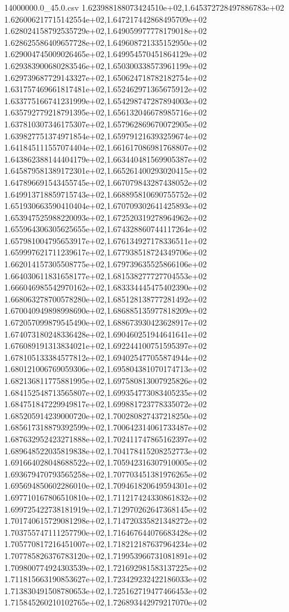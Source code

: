 \begin{filecontents*}{14000000.0_45.0.csv}
1.623988188073424510e+02,1.645372728497886783e+02
1.626006217715142554e+02,1.647217442868495709e+02
1.628024158792535729e+02,1.649059977778179018e+02
1.628625586409657728e+02,1.649608721335152950e+02
1.629004745009026465e+02,1.649954570451864129e+02
1.629383900680283546e+02,1.650300338573961199e+02
1.629739687729143327e+02,1.650624718782182754e+02
1.631757469661817481e+02,1.652462971365675912e+02
1.633775166741231999e+02,1.654298747287894003e+02
1.635792779218791395e+02,1.656132046678985716e+02
1.637810307346175307e+02,1.657962869670072905e+02
1.639827751374971854e+02,1.659791216393259674e+02
1.641845111557074404e+02,1.661617086981768807e+02
1.643862388144404179e+02,1.663440481569905387e+02
1.645879581389172301e+02,1.665261400293020415e+02
1.647896691543455745e+02,1.667079843287438052e+02
1.649913718859715743e+02,1.668895810690755752e+02
1.651930663590410404e+02,1.670709302641425893e+02
1.653947525988220093e+02,1.672520319278964962e+02
1.655964306305625655e+02,1.674328860744117264e+02
1.657981004795653917e+02,1.676134927178336511e+02
1.659997621711239617e+02,1.677938518724349706e+02
1.662014157305508775e+02,1.679739635525866106e+02
1.664030611831658177e+02,1.681538277727704553e+02
1.666046985542970162e+02,1.683334445475402390e+02
1.668063278700578280e+02,1.685128138777281492e+02
1.670040949898998690e+02,1.686885135977818209e+02
1.672057099879545490e+02,1.688673930423628917e+02
1.674073180248336428e+02,1.690460251944641641e+02
1.676089191313834021e+02,1.692244100751595397e+02
1.678105133384577812e+02,1.694025477055874944e+02
1.680121006769059306e+02,1.695804381070174713e+02
1.682136811775881995e+02,1.697580813007925826e+02
1.684152548713565807e+02,1.699354773083405235e+02
1.684751847229949817e+02,1.699881723778335072e+02
1.685205914239000720e+02,1.700280827437218250e+02
1.685617318879392599e+02,1.700642314061733487e+02
1.687632952423271888e+02,1.702411747865162397e+02
1.689648522035819838e+02,1.704178415208252773e+02
1.691664028048688522e+02,1.705942316307910005e+02
1.693679470793565258e+02,1.707703451381976265e+02
1.695694850602286010e+02,1.709461820649594301e+02
1.697710167806510810e+02,1.711217424330861832e+02
1.699725422738181919e+02,1.712970262647368145e+02
1.701740615729081298e+02,1.714720335821348272e+02
1.703755747111257790e+02,1.716467644076683428e+02
1.705770817216451007e+02,1.718212187637964234e+02
1.707785826376783120e+02,1.719953966731081891e+02
1.709800774924303539e+02,1.721692981583137225e+02
1.711815663190853627e+02,1.723429232422186033e+02
1.713830491508780653e+02,1.725162719477466453e+02
1.715845260210102765e+02,1.726893442979217070e+02

\end{filecontents*}
